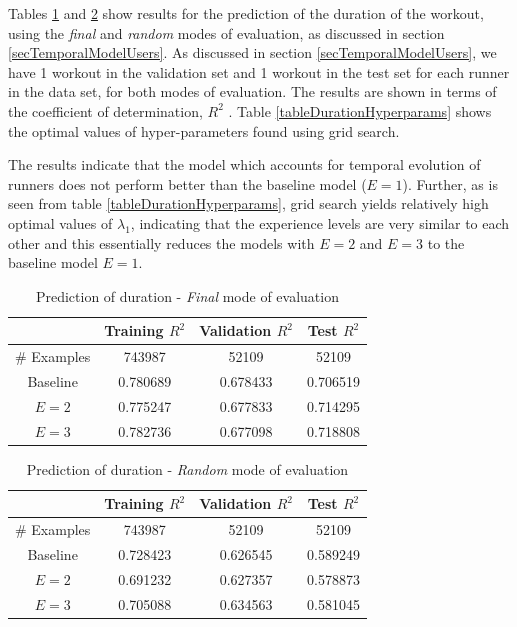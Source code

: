 \documentclass{acm_proc_article-sp}
\begin{document}
Tables \ref{tableDurationFinal} and \ref{tableDurationRandom} show results for the prediction of the duration of the workout, using the  \emph{final} and \emph{random} modes of evaluation, as discussed in section \ref{secTemporalModelUsers}. As discussed in section \ref{secTemporalModelUsers}, we have 1 workout in the validation set and 1 workout in the test set for each runner in the data set, for both modes of evaluation. The results are shown in terms of the coefficient of determination, $R^2$ \cite{r2Wiki}. Table \ref{tableDurationHyperparams} shows the optimal values of hyper-parameters found using grid search.

The results indicate that the model which accounts for temporal evolution of runners does not perform better than the baseline model ($E = 1$). Further, as is seen from table \ref{tableDurationHyperparams}, grid search yields relatively high optimal values of $\lambda_1$, indicating that the experience levels are very similar to each other and this essentially reduces the models with $E = 2$ and $E = 3$ to the baseline model $E = 1$.

\begin{table}[H]
\centering
\begin{tabular}{|c|c|c|c|} \hline
& Training $R^2$ & Validation $R^2$ & Test $R^2$ \\ \hline
\# Examples & 743987 & 52109 & 52109 \\ \hline
Baseline & 0.780689 & 0.678433 & 0.706519  \\ \hline
$E = 2$ & 0.775247 & 0.677833 & 0.714295 \\ \hline
$E = 3$ & 0.782736 & 0.677098 & 0.718808 \\ \hline
\end{tabular}
\caption{Prediction of duration - \emph{Final} mode of evaluation }
\label{tableDurationFinal}
\end{table}

\begin{table}[H]
\centering
\begin{tabular}{|c|c|c|c|} \hline
& Training $R^2$ & Validation $R^2$ & Test $R^2$ \\ \hline
\# Examples & 743987 & 52109 & 52109  \\ \hline
Baseline & 0.728423 & 0.626545 & 0.589249 \\ \hline
$E = 2$ & 0.691232 & 0.627357 & 0.578873 \\ \hline
$E = 3$ & 0.705088 & 0.634563 & 0.581045 \\ \hline
\end{tabular}
\caption{Prediction of duration - \emph{Random} mode of evaluation }
\label{tableDurationRandom}
\end{table}
\end{document}
